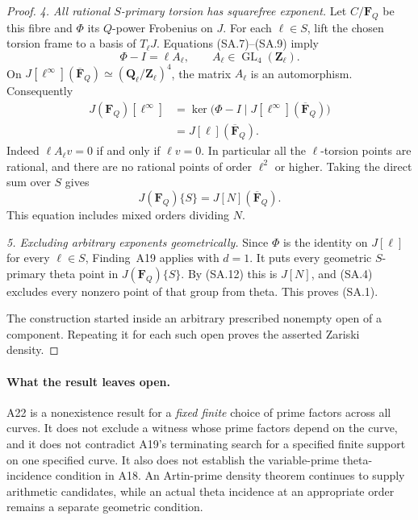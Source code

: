 \documentclass[11pt,a4paper]{article}
\begin{document}
\begin{proof}
\emph{4. All rational $S$-primary torsion has squarefree
exponent.}
Let $C/\mathbf F_Q$ be this fibre and
$\Phi$ its $Q$-power Frobenius on $J$.
For each $\ell\in S$, lift the chosen torsion frame to
a basis of $T_\ell J$.  Equations (SA.7)--(SA.9) imply
\[
             \Phi-I=\ell A_\ell,\qquad
                         A_\ell\in
                         \operatorname{GL}_4(\mathbf Z_\ell).
                                                               \tag{SA.10}
\]
On
$J[\ell^\infty](\overline{\mathbf F}_Q)
 \simeq(\mathbf Q_\ell/\mathbf Z_\ell)^4$,
the matrix $A_\ell$ is an automorphism.  Consequently
\[
 \begin{split}
 J(\mathbf F_Q)[\ell^\infty]
     &=\ker\bigl(\Phi-I\mid
                  J[\ell^\infty](\overline{\mathbf F}_Q)\bigr)\\
     &=J[\ell](\overline{\mathbf F}_Q).
 \end{split}                                                   \tag{SA.11}
\]
Indeed $\ell A_\ell v=0$ if and only if
$\ell v=0$.  In particular all the $\ell$-torsion
points are rational, and there are no rational points
of order $\ell^2$ or higher.  Taking the direct sum
over $S$ gives
\[
                  J(\mathbf F_Q)\{S\}
                          =J[N](\overline{\mathbf F}_Q).
                                                               \tag{SA.12}
\]
This equation includes mixed orders dividing $N$.

\emph{5. Excluding arbitrary exponents geometrically.}
Since $\Phi$ is the identity on $J[\ell]$ for every
$\ell\in S$, Finding~A19 applies with $d=1$.
It puts every geometric $S$-primary theta point in
$J(\mathbf F_Q)\{S\}$.  By (SA.12) this is $J[N]$,
and (SA.4) excludes every nonzero point of that group
from theta.  This proves (SA.1).

The construction started inside an arbitrary prescribed
nonempty open of a component.  Repeating it for each
such open proves the asserted Zariski density.
\end{proof}

\paragraph{What the result leaves open.}
A22 is a nonexistence result for a \emph{fixed finite}
choice of prime factors across all curves.  It does not
exclude a witness whose prime factors depend on the
curve, and it does not contradict A19's terminating
search for a specified finite support on one specified
curve.  It also does not establish the variable-prime
theta-incidence condition in A18.  An Artin-prime
density theorem continues to supply arithmetic
candidates, while an actual theta incidence at an
appropriate order remains a separate geometric
condition.
\end{document}
